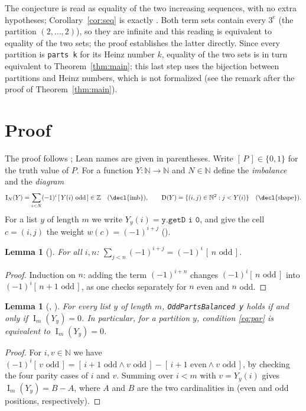 \documentclass[11pt]{amsart}
\theoremstyle{plain}
\newtheorem{lemma}[theorem]{Lemma}
\theoremstyle{definition}
\newcommand{\N}{\mathbb{N}}
\newcommand{\Z}{\mathbb{Z}}
\newcommand{\ind}[1]{[\,#1\,]}
\newcommand{\imb}{\operatorname{I}}
\newcommand{\sh}{\operatorname{D}}
\begin{document}
The conjecture is read as equality of the two increasing sequences, with no extra hypotheses; Corollary~\ref{cor:seq} is exactly . Both term sets contain every $3^e$ (the partition $(2,\dots,2)$), so they are infinite and this reading is equivalent to equality of the two sets; the proof establishes the latter directly. Since every partition is \texttt{parts k} for its Heinz number $k$, equality of the two sets is in turn equivalent to Theorem~\ref{thm:main}; this last step uses the bijection between partitions and Heinz numbers, which is not formalized (see the remark after the proof of Theorem~\ref{thm:main}).

\section{Proof}\label{sec:proof}

The proof follows ; Lean names are given in parentheses. Write $\ind{P}\in\{0,1\}$ for the truth value of $P$.
For a function $Y\colon\N\to\N$ and $N\in\N$ define the \emph{imbalance} and the \emph{diagram}
\[
\imb_N(Y)=\sum_{i<N}(-1)^i\,\ind{Y(i)\text{ odd}}\in\Z\quad(\text{\decl{imb}}),\qquad \sh(Y)=\{(i,j)\in\N^2: j<Y(i)\}\quad(\text{\decl{shape}}).
\]
For a list $y$ of length $m$ we write $Y_y(i)=\texttt{y.getD i 0}$, and give the cell $c=(i,j)$ the weight $w(c)=(-1)^{i+j}$ ().

\begin{lemma}[]\label{lem:row}
For all $i,n$: $\sum_{j<n}(-1)^{i+j}=(-1)^i\,\ind{n\text{ odd}}$.
\end{lemma}

\begin{proof}
Induction on $n$: adding the term $(-1)^{i+n}$ changes $(-1)^i\ind{n\text{ odd}}$ into $(-1)^i\ind{n+1\text{ odd}}$, as one checks separately for $n$ even and $n$ odd.
\end{proof}

\begin{lemma}[, ]\label{lem:balanced}
For every list $y$ of length $m$, \texttt{OddPartsBalanced y} holds if and only if $\imb_m(Y_y)=0$. In particular, for a partition $y$, condition \eqref{eq:par} is equivalent to $\imb_m(Y_y)=0$.
\end{lemma}

\begin{proof}
For $i,v\in\N$ we have $(-1)^i\ind{v\text{ odd}}=\ind{i+1\text{ odd}\wedge v\text{ odd}}-\ind{i+1\text{ even}\wedge v\text{ odd}}$, by checking the four parity cases of $i$ and $v$. Summing over $i<m$ with $v=Y_y(i)$ gives $\imb_m(Y_y)=B-A$, where $A$ and $B$ are the two cardinalities in  (even and odd positions, respectively).
\end{proof}
\end{document}
